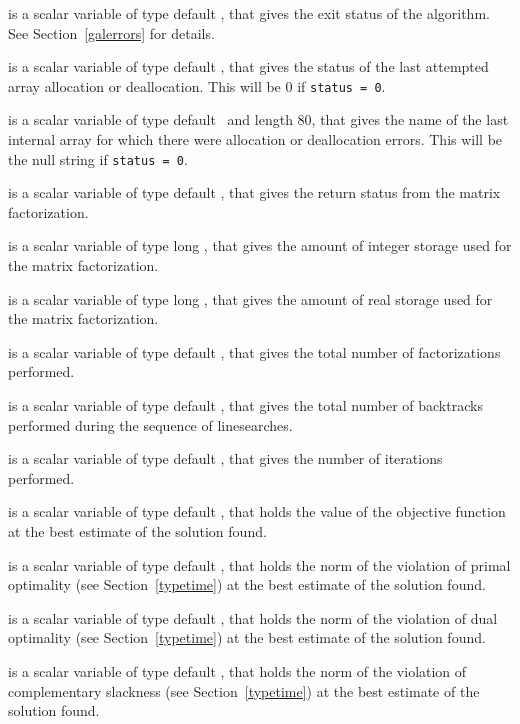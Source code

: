 \begin{description}

 is a scalar variable of type default \integer, that gives the
exit status of the algorithm. 
See Section~\ref{galerrors} 
for details.

 is a scalar variable of type default \integer, that gives
the status of the last attempted array allocation or deallocation.
This will be 0 if {\tt status = 0}.

 is a scalar variable of type default \character\
and length 80, that  gives the name of the last internal array 
for which there were allocation or deallocation errors.
This will be the null string if {\tt status = 0}. 

 is a scalar variable of type default \integer, that 
gives the return status from the matrix factorization.

 is a scalar variable of type long
\integer, that gives the amount of integer storage used for the matrix 
factorization.

 is a scalar variable of type long \integer, 
that gives the amount of real storage used for the matrix factorization.

 is a scalar variable of type default \integer, that gives the
total number of factorizations performed.

 is a scalar variable of type default \integer, that gives the
total number of backtracks performed during the sequence of linesearches.

 is a scalar variable of type default \integer, that 
gives the number of iterations performed.

 is a scalar variable of type default \realdp, that holds the
value of the objective function at the best estimate of the solution found.

 is a scalar variable of type default \realdp, 
that holds the norm of the violation of primal optimality 
(see Section~\ref{typetime}) at the best estimate of the solution found.

 is a scalar variable of type default \realdp, 
that holds the norm of the violation of dual optimality 
(see Section~\ref{typetime}) at the best estimate of the solution found.

is a scalar variable of type default \realdp, 
that holds the norm of the violation of complementary slackness
(see Section~\ref{typetime}) at the best estimate of the solution found.


\end{description}
